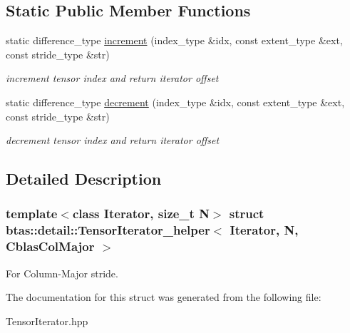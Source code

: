 \subsection*{Static Public Member Functions}
\begin{DoxyCompactItemize}
\item 
\hypertarget{structbtas_1_1detail_1_1_tensor_iterator__helper_3_01_iterator_00_01_n_00_01_cblas_col_major_01_4_a68de01f61371ea9b61924b1dd951636b}{
static difference\_\-type \hyperlink{structbtas_1_1detail_1_1_tensor_iterator__helper_3_01_iterator_00_01_n_00_01_cblas_col_major_01_4_a68de01f61371ea9b61924b1dd951636b}{increment} (index\_\-type \&idx, const extent\_\-type \&ext, const stride\_\-type \&str)}
\label{structbtas_1_1detail_1_1_tensor_iterator__helper_3_01_iterator_00_01_n_00_01_cblas_col_major_01_4_a68de01f61371ea9b61924b1dd951636b}

\begin{DoxyCompactList}\small\item\em increment tensor index and return iterator offset \item\end{DoxyCompactList}\item 
\hypertarget{structbtas_1_1detail_1_1_tensor_iterator__helper_3_01_iterator_00_01_n_00_01_cblas_col_major_01_4_a0976e1e9ea929c9f57857117229ee1a5}{
static difference\_\-type \hyperlink{structbtas_1_1detail_1_1_tensor_iterator__helper_3_01_iterator_00_01_n_00_01_cblas_col_major_01_4_a0976e1e9ea929c9f57857117229ee1a5}{decrement} (index\_\-type \&idx, const extent\_\-type \&ext, const stride\_\-type \&str)}
\label{structbtas_1_1detail_1_1_tensor_iterator__helper_3_01_iterator_00_01_n_00_01_cblas_col_major_01_4_a0976e1e9ea929c9f57857117229ee1a5}

\begin{DoxyCompactList}\small\item\em decrement tensor index and return iterator offset \item\end{DoxyCompactList}\end{DoxyCompactItemize}


\subsection{Detailed Description}
\subsubsection*{template$<$class Iterator, size\_\-t N$>$ struct btas::detail::TensorIterator\_\-helper$<$ Iterator, N, CblasColMajor $>$}

For Column-\/Major stride. 

The documentation for this struct was generated from the following file:\begin{DoxyCompactItemize}
\item 
TensorIterator.hpp\end{DoxyCompactItemize}
